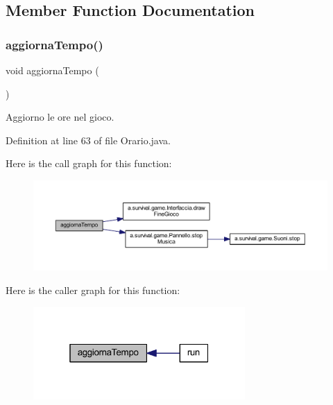 \subsection{Member Function Documentation}
\mbox{\label{classa_1_1survival_1_1game_1_1_orario_a397c02a7ddd736008cf4def497937bf2}} 
\subsubsection{\texorpdfstring{aggiorna\+Tempo()}{aggiornaTempo()}}
{\footnotesize\ttfamily void aggiorna\+Tempo (\begin{DoxyParamCaption}{ }\end{DoxyParamCaption})}



Aggiorno le ore nel gioco. 



Definition at line 63 of file Orario.\+java.

Here is the call graph for this function\+:
\nopagebreak
\begin{figure}[H]
\begin{center}
\leavevmode
\includegraphics[width=350pt]{classa_1_1survival_1_1game_1_1_orario_a397c02a7ddd736008cf4def497937bf2_cgraph}
\end{center}
\end{figure}
Here is the caller graph for this function\+:
\nopagebreak
\begin{figure}[H]
\begin{center}
\leavevmode
\includegraphics[width=229pt]{classa_1_1survival_1_1game_1_1_orario_a397c02a7ddd736008cf4def497937bf2_icgraph}
\end{center}
\end{figure}
\mbox{\label{classa_1_1survival_1_1game_1_1_orario_a51f5173282f478ea52841f6d8a77312b}} 
